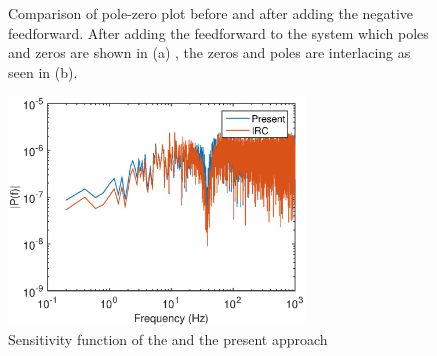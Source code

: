 \begin{figure}[h!]
  \centering %
  \qquad
  \caption{\label{fig:negfeedpzmap} Comparison of pole-zero plot before and after adding the negative feedforward. After adding the feedforward to the system which poles and zeros are shown in (a) , the zeros and poles are interlacing as seen in (b).}
\end{figure}

\begin{figure}[h!]
  \centering
  \includegraphics[width=0.7\textwidth]{fig/matlab/whitenoisetest.eps}
  \caption{\label{fig:sensitivity_irc} Sensitivity function of the \abbrIRC and the present approach}
\end{figure}

